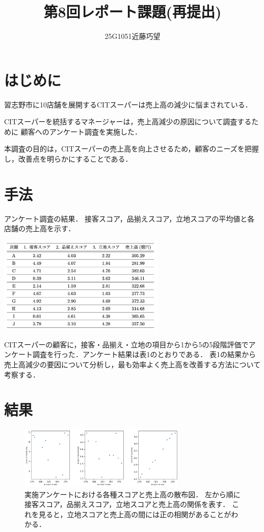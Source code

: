 \documentclass[uplatex]{jsarticle}
\begin{document}
\title{第8回レポート課題(再提出)}
\author{25G1051近藤巧望}
\maketitle

\section{はじめに}

習志野市に10店舗を展開するCITスーパーは売上高の減少に悩まされている．

CITスーパーを統括するマネージャーは，売上高減少の原因について調査するために
顧客へのアンケート調査を実施した．

本調査の目的は，CITスーパーの売上高を向上させるため，顧客のニーズを把握し，改善点を明らかにすることである．

\section{手法}

\begin{table}[H]
\caption{アンケート調査の結果．
接客スコア，品揃えスコア，立地スコアの平均値と各店舗の売上高を示す．}
\label{table:1}
\centering
\includegraphics[width=8cm]{./Figs/table.png}
\end{table}

\indent
CITスーパーの顧客に，接客・品揃え・立地の項目から1から5の5段階評価でアンケート調査を行った．アンケート結果は表1のとおりである．
表1の結果から売上高減少の要因について分析し，最も効率よく売上高を改善する方法について考察する．

\section{結果}

\begin{figure}[H]
\centering
\includegraphics[width=8cm]{./Figs/scatter.png}
\caption{実施アンケートにおける各種スコアと売上高の散布図．
左から順に接客スコア，品揃えスコア，立地スコアと売上高の関係を表す．
これを見ると，立地スコアと売上高の間には正の相関があることがわかる．}
\label{fig:1-1}
\end{figure}
\end{document}
